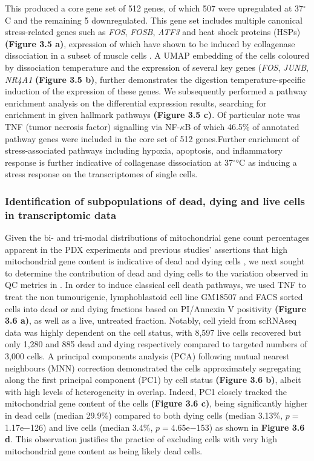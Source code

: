 This produced a core gene set of 512 genes, of which 507 were upregulated at 37$^{\circ}$ C and the remaining 5 downregulated. This gene set includes multiple canonical stress-related genes such as \emph{FOS}, \emph{FOSB}, \emph{ATF3} and heat shock proteins (HSPs) \textbf{(Figure 3.5 a)}, expression of which have shown to be induced by collagenase dissociation in a subset of muscle cells \cite{van2017single}. A UMAP embedding of the cells coloured by dissociation temperature and the expression of several key genes (\emph{FOS}, \emph{JUNB}, \emph{NR4A1} \textbf{(Figure 3.5 b)}, further demonstrates the digestion temperature-specific induction of the expression of these genes.
We subsequently performed a pathway enrichment analysis on the differential expression results, searching for enrichment in given hallmark pathways \cite{liberzon2015molecular} \textbf{(Figure 3.5 c)}. Of particular note was TNF (tumor necrosis factor) signalling via NF-$\kappa$B of which 46.5\% of annotated pathway genes were included in the core set of 512 genes.Further enrichment of stress-associated pathways including hypoxia, apoptosis, and inflammatory response is further indicative of collagenase dissociation at 37$^{\circ}$°C as inducing a stress response on the transcriptomes of single cells.


 \subsubsection{Identification of subpopulations of dead, dying and live cells in transcriptomic data}
Given the bi- and tri-modal distributions of mitochondrial gene count percentages apparent in the PDX experiments and previous studies' assertions that high mitochondrial gene content is indicative of dead and dying cells \cite{ilicic2016classification, zhao2002mitochondrial}, we next sought to determine the contribution of dead and dying cells to the variation observed in QC metrics in \cite{o2019dissociation}. In order to induce classical cell death pathways, we used TNF\textalpha \cite{carswell1975endotoxin, sedger2014tnf} to treat the non tumourigenic, lymphoblastoid cell line GM18507 and FACS sorted cells into dead or and dying fractions based on PI/Annexin V positivity \textbf{(Figure 3.6 a)}, as well as a live, untreated fraction. Notably, cell yield from scRNAseq data was highly dependent on the cell status, with 8,597 live cells recovered but only 1,280 and 885 dead and dying respectively compared to targeted numbers of 3,000 cells. 
A principal components analysis (PCA) following mutual nearest neighbours (MNN) correction \cite{haghverdi2018batch} demonstrated the cells approximately segregating along the first principal component (PC1) by cell status \textbf{(Figure 3.6 b)}, albeit with high levels of heterogeneity in overlap. Indeed, PC1 closely tracked the mitochondrial gene content of the cells \textbf{(Figure 3.6 c)}, being significantly higher in dead cells (median 29.9\%) compared to both dying cells (median 3.13\%, $p=$ 1.17e−126) and live cells (median 3.4\%, $p=$4.65e−153) as shown in \textbf{Figure 3.6 d}.
This observation justifies the practice of excluding cells with very high mitochondrial gene content as being likely dead cells.

